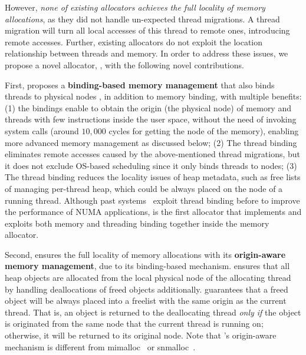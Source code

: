 However, \textit{none of existing allocators achieves the full locality of memory allocations}, as they did not handle un-expected thread migrations. A thread migration will turn all local accesses of this thread to remote ones, introducing remote accesses. Further,  existing allocators do not exploit the location relationship between threads and memory. In order to address these issues, we propose a novel allocator, \NM{}, with the following novel contributions.  


First, \NM{} proposes a \textbf{binding-based memory management} that also binds threads to physical nodes , in addition to memory binding, with multiple benefits: (1) the bindings enable \NM{} to obtain the origin (the physical node) of memory and threads with few instructions inside the user space, without the need of invoking system calls (around  $10,000$ cycles for getting the node of the memory), enabling more advanced memory management as discussed below; %
(2) The thread binding eliminates remote accesses caused by the above-mentioned thread migrations, but it does not exclude OS-based scheduling since it only binds threads to nodes; (3) The thread binding reduces the locality issues of heap metadata, such as free lists of managing per-thread heap, which could be always placed on the node of a running thread. Although past systems~\cite{li2013numa, XuNuma, Lepers:2015:TMP:2813767.2813788} exploit thread binding before to improve the performance of NUMA applications, \NM{} is the first allocator that implements and exploits both memory and threading binding together inside the memory allocator. 

Second, \NM{} ensures the full locality of memory allocations with its \textbf{origin-aware memory management}, due to its binding-based mechanism. \NM{} ensures that all heap objects are allocated from the local physical node of the allocating thread by handling deallocations of freed objects additionally. 
\NM{} guarantees that a freed object will be always placed into a freelist with the same origin as the current thread. That is, an object is returned to the deallocating thread \textit{only if} the object is originated from the same node that the current thread is running on; otherwise, it will be returned to its original node.  Note that \NM{}'s origin-aware mechanism is different from mimalloc~\cite{mimalloc} or snmalloc~\cite{Snmalloc}. 

